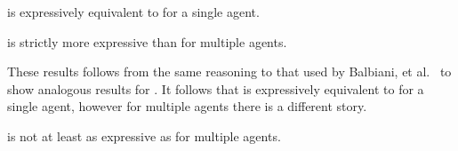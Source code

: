 \begin{theorem}
    \logicPapalS{} is expressively equivalent to \logicPalS{} for a single agent.
\end{theorem}

\begin{theorem}
    \logicPapalS{} is strictly more expressive than \logicPalS{} for multiple agents.
\end{theorem}

These results follows from the same reasoning to that used by Balbiani, et al.~\cite{balbiani:2008} to show analogous results for \logicApalS{}.
It follows that \logicPapalS{} is expressively equivalent to \logicApalS{} for a single agent, however for multiple agents there is a different story.

\begin{theorem}\label{expressivity-s5}
    \logicPapalS{} is not at least as expressive as \logicApalS{} for multiple agents.
\end{theorem}

